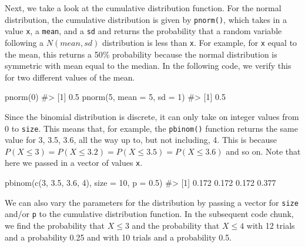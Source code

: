 \documentclass[
  letterpaper,
]{latex/krantz}
\makeatletter
\newenvironment{Shaded}{\begin{snugshade}}{\end{snugshade}}
\newcommand{\AttributeTok}[1]{\textcolor[rgb]{0.40,0.45,0.13}{#1}}
\newcommand{\CommentTok}[1]{\textcolor[rgb]{0.37,0.37,0.37}{#1}}
\newcommand{\DecValTok}[1]{\textcolor[rgb]{0.68,0.00,0.00}{#1}}
\newcommand{\FloatTok}[1]{\textcolor[rgb]{0.68,0.00,0.00}{#1}}
\newcommand{\FunctionTok}[1]{\textcolor[rgb]{0.28,0.35,0.67}{#1}}
\newcommand{\NormalTok}[1]{\textcolor[rgb]{0.00,0.23,0.31}{#1}}
\newenvironment{kframe}{%
\medskip{}
\setlength{\fboxsep}{.8em}
 \def\at@end@of@kframe{}%
 \ifinner\ifhmode%
  \def\at@end@of@kframe{\end{minipage}}%
  \begin{minipage}{\columnwidth}%
 \fi\fi%
 \def\FrameCommand##1{\hskip\@totalleftmargin \hskip-\fboxsep
 \colorbox{shadecolor}{##1}\hskip-\fboxsep
     \hskip-\linewidth \hskip-\@totalleftmargin \hskip\columnwidth}%
 \MakeFramed {\advance\hsize-\width
   \@totalleftmargin\z@ \linewidth\hsize
   \@setminipage}}%
 {\par\unskip\endMakeFramed%
 \at@end@of@kframe}
\renewenvironment{Shaded}{\begin{kframe}}{\end{kframe}}
\makeatother
\begin{document}
Next, we take a look at the cumulative distribution function. For the
normal distribution, the cumulative distribution is given by
\texttt{pnorm()}, which takes in a value \texttt{x}, a \texttt{mean},
and a \texttt{sd} and returns the probability that a random variable
following a \(N(mean, sd)\) distribution is less than \texttt{x}. For
example, for \texttt{x} equal to the mean, this returns a 50\%
probability because the normal distribution is symmetric with mean equal
to the median. In the following code, we verify this for two different
values of the mean.

\begin{Shaded}
\begin{Highlighting}[]
\FunctionTok{pnorm}\NormalTok{(}\DecValTok{0}\NormalTok{)}
\CommentTok{\#\textgreater{} [1] 0.5}
\FunctionTok{pnorm}\NormalTok{(}\DecValTok{5}\NormalTok{, }\AttributeTok{mean =} \DecValTok{5}\NormalTok{, }\AttributeTok{sd =} \DecValTok{1}\NormalTok{)}
\CommentTok{\#\textgreater{} [1] 0.5}
\end{Highlighting}
\end{Shaded}

Since the binomial distribution is discrete, it can only take on integer
values from 0 to \texttt{size}. This means that, for example, the
\texttt{pbinom()} function returns the same value for 3, 3.5, 3.6, all
the way up to, but not including, 4. This is because
\(P(X \leq 3) = P(X \leq 3.2) = P(X \leq 3.5) = P(X \leq 3.6)\) and so
on. Note that here we passed in a vector of values \texttt{x}.

\begin{Shaded}
\begin{Highlighting}[]
\FunctionTok{pbinom}\NormalTok{(}\FunctionTok{c}\NormalTok{(}\DecValTok{3}\NormalTok{, }\FloatTok{3.5}\NormalTok{, }\FloatTok{3.6}\NormalTok{, }\DecValTok{4}\NormalTok{), }\AttributeTok{size =} \DecValTok{10}\NormalTok{, }\AttributeTok{p =} \FloatTok{0.5}\NormalTok{)}
\CommentTok{\#\textgreater{} [1] 0.172 0.172 0.172 0.377}
\end{Highlighting}
\end{Shaded}

We can also vary the parameters for the distribution by passing a vector
for \texttt{size} and/or \texttt{p} to the cumulative distribution
function. In the subsequent code chunk, we find the probability that
\(X \leq 3\) and the probability that \(X \leq 4\) with 12 trials and a
probability 0.25 and with 10 trials and a probability 0.5.
\end{document}
